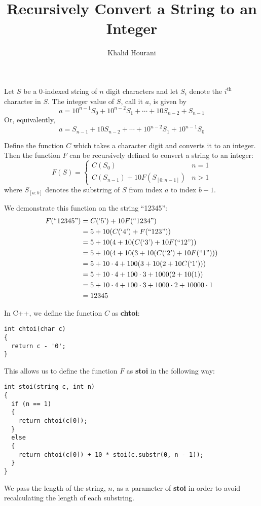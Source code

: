 \documentclass[a4paper]{article}
\title{Recursively Convert a String to an Integer}
\author{Khalid Hourani}
\begin{document}
\maketitle
Let $S$ be a 0-indexed string of $n$ digit characters and let $S_i$ denote the $i^{\text{th}}$ character in $S$. The integer value of $S$, call it $a$, is given by \[a=10^{n-1}S_0+10^{n-2}S_1+\cdots+10S_{n-2}+S_{n-1}\] Or, equivalently, \[a=S_{n-1}+10S_{n-2}+\cdots+10^{n-2}S_1+10^{n-1}S_0\]

Define the function $C$ which takes a character digit and converts it to an integer. Then the function $F$ can be recursively defined to convert a string to an integer: \[F(S)=\begin{cases}C(S_0) & n = 1\\C(S_{n-1}) + 10F(S_{[0:n-1]}) & n > 1\end{cases}\] where $S_{[a:b]}$ denotes the substring of $S$ from index $a$ to index $b-1$.

We demonstrate this function on the string ``12345'':\begin{align*}F(``12345\text{''})&=C(`5\text{'})+10F(``1234\text{''})\\&=5+10(C(`4\text{'})+F(``123\text{''}))
\\&=5+10(4+10(C(`3\text{'})+10F(``12\text{''}))
\\&=5+10(4+10(3+10(C(`2\text{'})+10F(``1\text{''})))
\\&=5+10\cdot4+100(3+10(2+10C(`1\text{'})))
\\&=5+10\cdot4+100\cdot3+1000(2+10(1))
\\&=5+10\cdot4+100\cdot3+1000\cdot2+10000\cdot1
\\&=12345\end{align*}


In C++, we define the function $C$ as \textbf{chtoi}:

\begin{verbatim}
int chtoi(char c)
{
  return c - '0';
}
\end{verbatim}

This allows us to define the function $F$ as \textbf{stoi} in the following way:

\begin{verbatim}
int stoi(string c, int n)
{
  if (n == 1)
  {
    return chtoi(c[0]);
  }
  else
  {
    return chtoi(c[0]) + 10 * stoi(c.substr(0, n - 1));
  }
}
\end{verbatim}

We pass the length of the string, $n$, as a parameter of \textbf{stoi} in order to avoid recalculating the length of each substring. 
\end{document}
